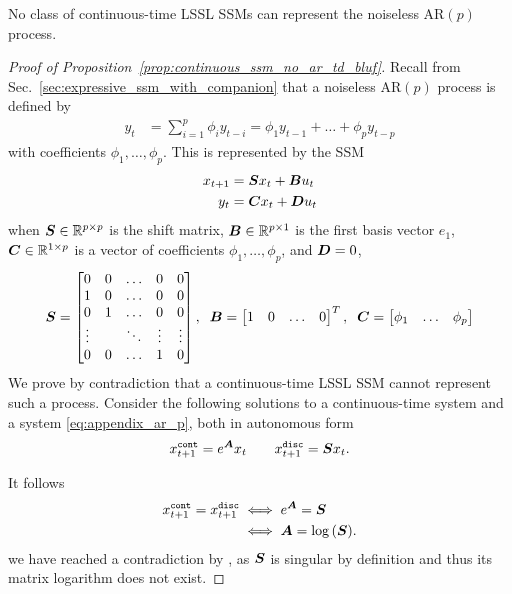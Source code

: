 \begin{p2}
    No class of continuous-time LSSL SSMs can represent the noiseless $\text{AR}(p)$ process.  
\end{p2}
%
\begin{proof}[Proof of Proposition~\ref{prop:continuous_ssm_no_ar_td_bluf}]
%
Recall from Sec.~\ref{sec:expressive_ssm_with_companion} that a noiseless $\text{AR}(p)$ process is defined by
\begin{align}
    y_{t} 
    &= \sum_{i = 1}^p \phi_i y_{t - i} = \phi_1y_{t - 1} + \ldots + \phi_p y_{t - p} \label{eq:appendix_ar_p}
\end{align}
with coefficients $\phi_1, \ldots, \phi_p$. This is represented by the SSM
\begin{align}
    x_{t + 1} &= \boldsymbol{S} x_{t} + \boldsymbol{B} u_{t} \\
    y_{t } &= \boldsymbol{C} x_{t} + \boldsymbol{D} u_{t} 
\end{align}
when $\boldsymbol{S} \in \mathbb{R}^{p \times p}$ is the shift matrix, $\boldsymbol{B} \in \mathbb{R}^{p \times 1}$ is the first basis vector $e_1$, $\boldsymbol{C} \in \mathbb{R}^{1 \times p}$ is a vector of coefficients $\phi_1, \ldots, \phi_p$, and $\boldsymbol{D} = 0$, \ie{}
\begin{align}
    \boldsymbol{S} = 
    \begin{bmatrix}
    0  & 0  & \ldots & 0 & 0 \\
    1 & 0  &\ldots & 0 & 0 \\ 
    0 & 1 & \ldots & 0 & 0 \\
    \vdots &    & \ddots  & \vdots  & \vdots \\
    0 & 0  & \ldots & 1 & 0 \\
    \end{bmatrix},
    \;\;
    \boldsymbol{B} = 
    \begin{bmatrix}
    1 & 0 & \ldots & 0
    \end{bmatrix}^T, 
    \;\; 
    \boldsymbol{C} = 
    \begin{bmatrix}
    \phi_1 & \ldots & \phi_p
    \end{bmatrix}
\label{eq:shift_matrix_example}
\end{align}
We prove by contradiction that a continuous-time LSSL SSM cannot represent such a process. Consider the following solutions to a continuous-time system and a system \eqref{eq:appendix_ar_p}, both in autonomous form
\[
\begin{aligned}
    x^{\tt cont}_{t + 1} = e^{\boldsymbol{A}} x_t \quad\quad x^{\tt disc}_{t + 1} = \boldsymbol{S} x_t.
\end{aligned}
\]

It follows 
\[
\begin{aligned}
x^{\tt cont}_{t + 1} = x^{\tt disc}_{t + 1} &\iff e^{\boldsymbol{A}} = \boldsymbol{S} \\ 
&\iff \boldsymbol{A} = \log{(\boldsymbol{S})}.
\end{aligned}
\]
we have reached a contradiction by \citep[Theorem 1]{culver1966existence}, as $\boldsymbol{S}$ is singular by definition and thus its matrix logarithm does not exist.


\end{proof}



